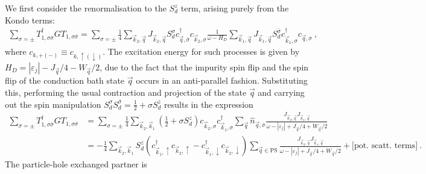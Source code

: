 \documentclass{revtex4-2}
\begin{document}
We first consider the renormalisation to the \(S_d^z\) term, arising purely from the Kondo terms:
\begin{equation}\begin{aligned}
	\sum_{\sigma=\pm}T_{1,\sigma\bar\sigma}^\dagger G T_{1,\sigma\bar\sigma} = \sum_{\sigma=\pm}\frac{1}{4}\sum_{\vec k_2,\vec q}J_{\vec k_2,\vec q} S_d^\sigma c^\dagger_{\vec q,\bar\sigma} c_{\vec k_2,\sigma} \frac{1}{\omega - H_D}\sum_{\vec k_1,\vec q}J_{\vec k_1,\vec q} S_d^{\bar\sigma} c^\dagger_{\vec k_1,\sigma} c_{\vec q,\bar\sigma}~,
\end{aligned}\end{equation}
where \(c_{k,+(-)} \equiv c_{k,\uparrow(\downarrow)}\). The excitation energy for such processes is given by \(H_D = |\varepsilon_j| - J_{\vec q}/4 - W_{\vec q}/2\), due to the fact that the impurity spin flip and the spin flip of the conduction bath state \(\vec q\) occurs in an anti-parallel fashion. Substituting this, performing the usual contraction and projection of the state \(\vec q\) and carrying out the spin manipulation \(S_d^\sigma S_d^{\bar\sigma} = \frac{1}{2} + \sigma S_d^z\) results in the expression
\begin{equation}\begin{aligned}
	\sum_{\sigma=\pm}T_{1,\sigma\bar\sigma}^\dagger G T_{1,\sigma\bar\sigma} &= \sum_{\sigma=\pm}\frac{1}{4}\sum_{\vec k_2,\vec k_1} \left(\frac{1}{2} + \sigma S_d^z\right) c_{\vec k_2,\sigma} c^\dagger_{\vec k_1,\sigma}\sum_{\vec q}  \hat n_{\vec q,\bar\sigma} \frac{J_{\vec k_2,\vec q} J_{\vec k_1,\vec q}}{\omega - |\varepsilon_j| + J_{\vec q}/4 + W_{\vec q}/2}\\
										 &= -\frac{1}{4}\sum_{\vec k_2,\vec k_1} S_d^z \left(c^\dagger_{\vec k_1,\uparrow}c_{\vec k_2,\uparrow} - c^\dagger_{\vec k_1,\downarrow}c_{\vec k_2,\downarrow}\right)\sum_{\vec q \in \text{PS}} \frac{J_{\vec k_2,\vec q} J_{\vec k_1,\vec q}}{\omega - |\varepsilon_j| + J_{\vec q}/4 + W_{\vec q}/2} + \bigg[\text{pot. scatt. terms}\bigg]~.
\end{aligned}\end{equation}
The particle-hole exchanged partner is
\end{document}
